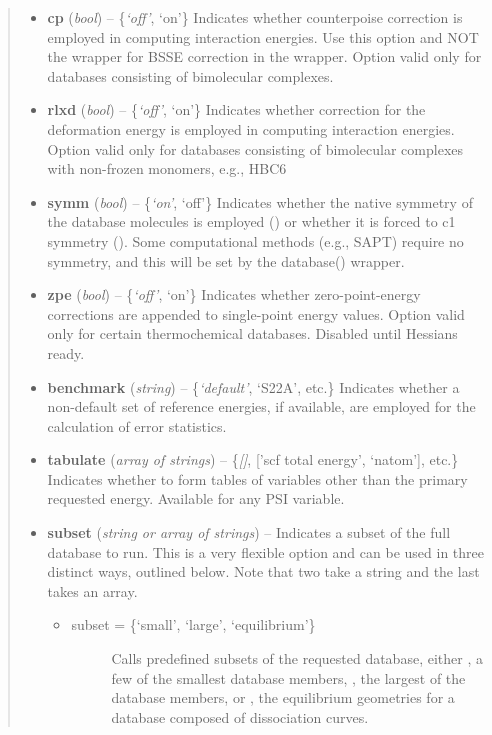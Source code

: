 \documentclass[letterpaper,10pt,english]{sphinxmanual}
\begin{document}
\begin{fulllineitems}
\begin{quote}
\begin{description}
\begin{itemize}
\item {} 
\textbf{cp} (\emph{bool}) -- \{\emph{`off'}, `on'\}
Indicates whether counterpoise correction is employed in computing
interaction energies.  Use this option and NOT the 
wrapper for BSSE correction in the  wrapper.  Option
valid only for databases consisting of bimolecular complexes.

\item {} 
\textbf{rlxd} (\emph{bool}) -- \{\emph{`off'}, `on'\}
Indicates whether correction for the deformation energy is
employed in computing interaction energies.  Option valid only for
databases consisting of bimolecular complexes with non-frozen
monomers, e.g., HBC6

\item {} 
\textbf{symm} (\emph{bool}) -- \{\emph{`on'}, `off'\}
Indicates whether the native symmetry of the database molecules is
employed () or whether it is forced to c1 symmetry
(). Some computational methods (e.g., SAPT) require no
symmetry, and this will be set by the database() wrapper.

\item {} 
\textbf{zpe} (\emph{bool}) -- \{\emph{`off'}, `on'\}
Indicates whether zero-point-energy corrections are appended to
single-point energy values. Option valid only for certain
thermochemical databases.  Disabled until Hessians ready.

\item {} 
\textbf{benchmark} (\emph{string}) -- \{\emph{`default'}, `S22A', etc.\}
Indicates whether a non-default set of reference energies, if
available, are employed for the calculation of error statistics.

\item {} 
\textbf{tabulate} (\emph{array of strings}) -- \{\emph{{[}{]}}, {[}'scf total energy', `natom'{]}, etc.\}
Indicates whether to form tables of variables other than the
primary requested energy.  Available for any PSI variable.

\item {} 
\textbf{subset} (\emph{string or array of strings}) -- 
Indicates a subset of the full database to run. This is a very
flexible option and can be used in three distinct ways, outlined
below. Note that two take a string and the last takes an array.
\begin{itemize}
\item {} \begin{description}
\item[{subset = \{`small', `large', `equilibrium'\}}] \leavevmode
Calls predefined subsets of the requested database, either
, a few of the smallest database members,
, the largest of the database members, or
, the equilibrium geometries for a database
composed of dissociation curves.


\end{description}
\end{itemize}
\end{itemize}
\end{description}
\end{quote}
\end{fulllineitems}
\end{document}
